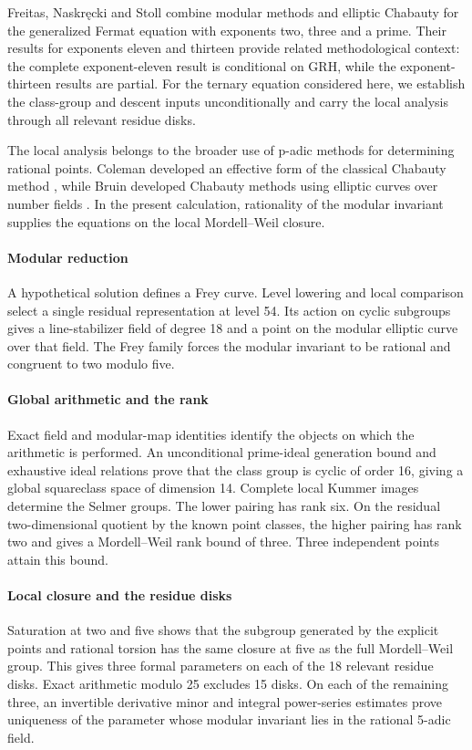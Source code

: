 \documentclass[11pt,a4paper]{article}
\theoremstyle{definition}\newtheorem{definition}[theorem]{Definition}
\theoremstyle{remark}\newtheorem{remark}[theorem]{Remark}
\begin{document}
Freitas, Naskr\k{e}cki and Stoll \cite{FNS} combine modular methods and elliptic Chabauty for the generalized Fermat equation with exponents two, three and a prime. Their results for exponents eleven and thirteen provide related methodological context: the complete exponent-eleven result is conditional on GRH, while the exponent-thirteen results are partial. For the ternary equation considered here, we establish the class-group and descent inputs unconditionally and carry the local analysis through all relevant residue disks.

The local analysis belongs to the broader use of p-adic methods for determining rational points. Coleman developed an effective form of the classical Chabauty method \cite{Coleman}, while Bruin developed Chabauty methods using elliptic curves over number fields \cite{Bruin}. In the present calculation, rationality of the modular invariant supplies the equations on the local Mordell--Weil closure.

\paragraph{Modular reduction} A hypothetical solution defines a Frey curve. Level lowering and local comparison select a single residual representation at level 54. Its action on cyclic subgroups gives a line-stabilizer field of degree 18 and a point on the modular elliptic curve over that field. The Frey family forces the modular invariant to be rational and congruent to two modulo five.

\paragraph{Global arithmetic and the rank} Exact field and modular-map identities identify the objects on which the arithmetic is performed. An unconditional prime-ideal generation bound and exhaustive ideal relations prove that the class group is cyclic of order 16, giving a global squareclass space of dimension 14. Complete local Kummer images determine the Selmer groups. The lower pairing has rank six. On the residual two-dimensional quotient by the known point classes, the higher pairing has rank two and gives a Mordell--Weil rank bound of three. Three independent points attain this bound.

\paragraph{Local closure and the residue disks} Saturation at two and five shows that the subgroup generated by the explicit points and rational torsion has the same closure at five as the full Mordell--Weil group. This gives three formal parameters on each of the 18 relevant residue disks. Exact arithmetic modulo 25 excludes 15 disks. On each of the remaining three, an invertible derivative minor and integral power-series estimates prove uniqueness of the parameter whose modular invariant lies in the rational 5-adic field.
\end{document}
